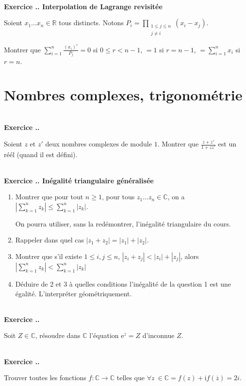 \documentclass{article}
\newcommand{\mb}[1]{\mathbb{#1}}
\newcounter{exo}
\newcommand{\exercice}[1][\null]{\textbf{\\ \large Exercice \thesection.\theexo. \normalsize #1} \addtocounter{exo}{1}}
\begin{document}
\exercice[Interpolation de Lagrange revisitée]

Soient $x_1 \dots x_n \in \mb{R}$ tous distincts. Notons $\displaystyle P_i =  \prod_{\substack{1 \le j \le n \\ j \neq i}} (x_i - x_j)$.

Montrer que $\displaystyle \sum_{i=1}^n \frac{(x_i)^r}{P_j} = 0$ si $0 \le r < n-1$,  $=1$ si $r = n-1$, $=\displaystyle \sum_{i=1}^n x_i$ si $r = n$.






\section{Nombres complexes, trigonométrie}

\exercice

Soient $z$ et $z'$ deux nombres complexes de module $1$. Montrer que $\displaystyle \frac{z+z'}{1+zz'}$ est un réél (quand il est défini).

\exercice[Inégalité triangulaire généralisée]

\begin{enumerate}

\item Montrer que pour tout $n \ge 1$, pour tous $z_1 \dots z_n \in \mb{C}$, on a $\displaystyle \left|\sum_{k=1}^n z_k\right| \le \sum_{k=1}^n | z_k |$.

On pourra utiliser, sans la redémontrer, l'inégalité triangulaire du cours.

\item Rappeler dans quel cas $|z_1 + z_2| = |z_1| + |z_2|$.

\item Montrer que s'il existe $1 \le i,j \le n$, $|z_i + z_j| < |z_i| + |z_j|$, alors $ \left|\sum_{k=1}^n z_k\right| < \sum_{k=1}^n | z_k |$ 

\item Déduire de 2 et 3 à quelles conditions l'inégalité de la question 1 est une égalité. L'interpréter géométriquement.

\end{enumerate}

\exercice

Soit $Z \in \mb{C}$, résoudre dans $\mb{C}$ l'équation $\text{e}^z  = Z$ d'inconnue $Z$.


\exercice

Trouver toutes les fonctions $f : \mb{C} \rightarrow \mb{C}$ telles que $\forall z~\in \mb{C} = f(z) + \text{i} f(\overline{z}) = 2i$.
\end{document}
